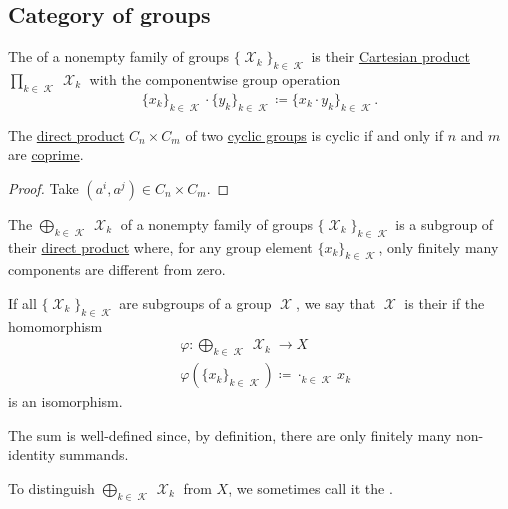 \subsection{Category of groups}\label{subsec:category_of_groups}

\begin{definition}\label{def:group_direct_product}
  The  of a nonempty family of groups \( \{ \mscrX_k \}_{k \in \mscrK} \) is their \hyperref[def:tuple_and_cartesian_product]{Cartesian product} \( \prod_{k \in \mscrK} \mscrX_k \) with the componentwise group operation
  \begin{equation*}
    \{ x_k \}_{k \in \mscrK} \cdot \{ y_k \}_{k \in \mscrK}
    \coloneqq
    \{ x_k \cdot y_k \}_{k \in \mscrK}.
  \end{equation*}
\end{definition}

\begin{proposition}\label{thm:product_of_cyclic_groups}
  The \hyperref[def:group_direct_product]{direct product} \( C_n \times C_m \) of two \hyperref[def:cyclic_group]{cyclic groups} is cyclic if and only if \( n \) and \( m \) are \hyperref[def:coprime_numbers]{coprime}.
\end{proposition}
\begin{proof}
  Take \( (a^i, a^j) \in C_n \times C_m \).
\end{proof}

\begin{definition}\label{def:group_direct_sum}
  The  \( \bigoplus_{k \in \mscrK} \mscrX_k \) of a nonempty family of groups \( \{ \mscrX_k \}_{k \in \mscrK} \) is a subgroup of their \hyperref[def:group_direct_sum]{direct product} where, for any group element \( \{ x_k \}_{k \in \mscrK} \), only finitely many components are different from zero.

  \begin{thmenum}
    If all \( \{ \mscrX_k \}_{k \in \mscrK} \) are subgroups of a group \( \mscrX \), we say that \( \mscrX \) is their  if the homomorphism
    \begin{align*}
       &\varphi: \bigoplus_{k \in \mscrK} \mscrX_k \to X \\
       &\varphi(\{ x_k \}_{k \in \mscrK}) \coloneqq \cdot_{k \in \mscrK} x_k
    \end{align*}
    is an isomorphism.

    The sum is well-defined since, by definition, there are only finitely many non-identity summands.

     To distinguish \( \bigoplus_{k \in \mscrK} \mscrX_k \) from \( X \), we sometimes call it the .
  \end{thmenum}
\end{definition}


